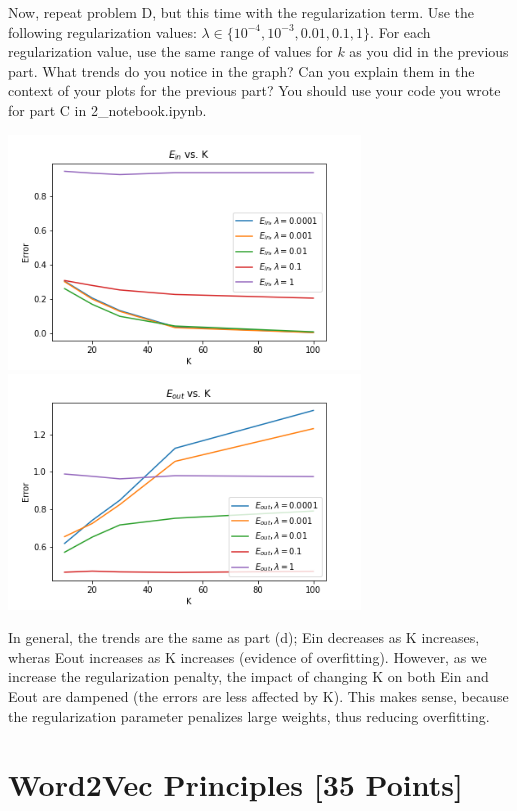 \problem[5]
Now, repeat problem D, but this time with the regularization term. Use the following regularization values: $\lambda \in \{10^{-4}, 10^{-3}, 0.01, 0.1, 1\}$. For each regularization value, use the same range of values for $k$ as you did in the previous part. What trends do you notice in the graph? Can you explain them in the context of your plots for the previous part? You should use your code you wrote for part C in 2_notebook.ipynb.

\begin{solution}
	\begin{center}
		\includegraphics[width=0.7\textwidth]{2e_ein.png}
		\includegraphics[width=0.7\textwidth]{2e_eout.png}
	\end{center}
	In general, the trends are the same as part (d); Ein decreases as K increases, wheras Eout increases as K increases (evidence of overfitting). However, as we increase the regularization penalty, the impact of changing K on both Ein and Eout are dampened (the errors are less affected by K). This makes sense, because the regularization parameter penalizes large weights, thus reducing overfitting.
\end{solution}






\newpage
\section{Word2Vec Principles [35 Points]}

